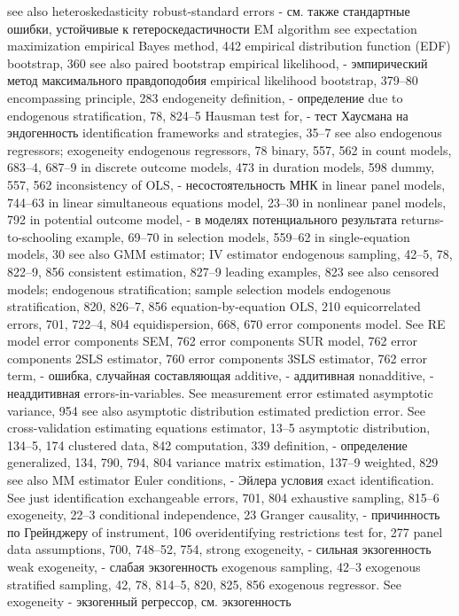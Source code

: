 see also heteroskedasticity robust-standard errors - см. также стандартные ошибки, устойчивые к гетероскедастичности
EM algorithm see expectation maximization empirical Bayes method, 442
empirical distribution function (EDF) bootstrap, 360
see also paired bootstrap
empirical likelihood, - эмпирический метод максимального правдоподобия
empirical likelihood bootstrap, 379–80 encompassing principle, 283 endogeneity
definition, - определение
due to endogenous stratification, 78, 824–5 
Hausman test for,  - тест Хаусмана на эндогенность
identification frameworks and strategies, 35–7
see also endogenous regressors; exogeneity endogenous regressors, 78
binary, 557, 562
in count models, 683–4, 687–9
in discrete outcome models, 473
in duration models, 598
dummy, 557, 562
inconsistency of OLS, - несостоятельность МНК
in linear panel models, 744–63
in linear simultaneous equations model, 23–30 in nonlinear panel models, 792
in potential outcome model, - в моделях потенциального результата
returns-to-schooling example, 69–70
in selection models, 559–62
in single-equation models, 30
see also GMM estimator; IV estimator
endogenous sampling, 42–5, 78, 822–9, 856 consistent estimation, 827–9
leading examples, 823
see also censored models; endogenous
stratification; sample selection models endogenous stratification, 820, 826–7, 856 equation-by-equation OLS, 210 equicorrelated errors, 701, 722–4, 804 equidispersion, 668, 670
error components model. See RE model error components SEM, 762
error components SUR model, 762 error components 2SLS estimator, 760 error components 3SLS estimator, 762 
error term, - ошибка, случайная составляющая
additive, - аддитивная
nonadditive, - неаддитивная
errors-in-variables. See measurement error estimated asymptotic variance, 954
see also asymptotic distribution
estimated prediction error. See cross-validation estimating equations estimator, 13–5
asymptotic distribution, 134–5, 174 clustered data, 842
computation, 339
definition, - определение
generalized, 134, 790, 794, 804 variance matrix estimation, 137–9 weighted, 829
see also MM estimator
Euler conditions, - Эйлера условия
exact identification. See just identification exchangeable errors, 701, 804
exhaustive sampling, 815–6
exogeneity, 22–3
conditional independence, 23
Granger causality, - причинность по Грейнджеру
of instrument, 106
overidentifying restrictions test for, 277 panel data assumptions, 700, 748–52, 754,
strong exogeneity, - сильная экзогенность
weak exogeneity, - слабая экзогенность
exogenous sampling, 42–3
exogenous stratified sampling, 42, 78, 814–5, 820,
825, 856
exogenous regressor. See exogeneity - экзогенный регрессор, см. экзогенность
